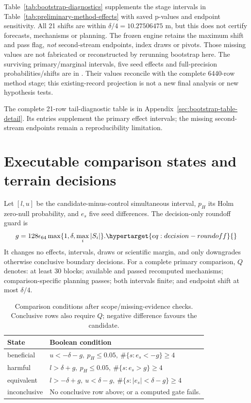 Table~\ref{tab:bootstrap-diagnostics} supplements the stage intervals in
Table~\ref{tab:preliminary-method-effects} with saved p-values and endpoint
sensitivity. All 21 shifts are within \(\delta/4=10.27506475\) m, but this
does not certify forecasts, mechanisms or planning. The frozen engine
retains the maximum shift and pass flag, \emph{not} second-stream endpoints,
index draws or pivots. Those missing values are not fabricated or reconstructed
by rerunning bootstrap here. The surviving primary/marginal intervals,
five seed effects and full-precision probabilities/shifts are in
. Their values reconcile
with the complete 6440-row method stage; this existing-record projection
is not a new final analysis or new hypothesis tests.

The complete 21-row tail-diagnostic table is in Appendix~\ref{sec:bootstrap-table-detail}.
Its entries supplement the primary effect intervals; the missing second-stream
endpoints remain a reproducibility limitation.


\section{Executable comparison states and terrain decisions}
\label{sec:decision-conditions}\hypertarget{sec:decision-conditions}{}
Let \([l,u]\) be the candidate-minus-control simultaneous interval,
\(p_H\) its Holm zero-null probability, and \(e_s\) five seed differences.
The decision-only roundoff guard is
\begin{equation}
 g=128\epsilon_{64}\max\{1,\delta,\max_i|S_i|\}.
 \label{eq:decision-roundoff}\hypertarget{eq:decision-roundoff}{}
\end{equation}
It changes no effects, intervals, draws or scientific margin, and only
downgrades otherwise conclusive boundary decisions. For a complete primary
comparison, \(Q\) denotes: at least 30 blocks; available and passed recomputed
mechanisms; comparison-specific planning passes; both intervals finite;
and endpoint shift at most \(\delta/4\).

\begin{table}[htbp]
\centering\small
\caption{Comparison conditions after scope/missing-evidence checks.
Conclusive rows also require \(Q\); negative difference favours the candidate.}
\label{tab:comparison-conditions}\hypertarget{tab:comparison-conditions}{}
\begin{tabular}{lp{4.8in}}
\toprule
State & Boolean condition\\
\midrule
beneficial & \(u<-\delta-g,\ p_H\leq0.05,\ \#\{s:e_s<-g\}\geq4\)\\
harmful & \(l>\delta+g,\ p_H\leq0.05,\ \#\{s:e_s>g\}\geq4\)\\
equivalent & \(l>-\delta+g,\ u<\delta-g,\ \#\{s:|e_s|<\delta-g\}\geq4\)\\
inconclusive & No conclusive row above; or a computed gate fails.\\
\bottomrule
\end{tabular}
\end{table}

